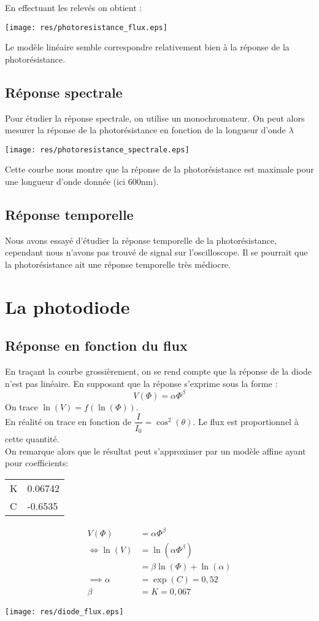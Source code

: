 \documentclass[12pt,a4paper]{article}
\begin{document}
	En effectuant les relevés on obtient : 
	\begin{center}
		\texttt{[image: res/photoresistance\_flux.eps]}
	\end{center}
	Le modèle linéaire semble correspondre relativement bien à la réponse de la photorésistance.
	
	\subsection{Réponse spectrale}
	Pour étudier la réponse spectrale, on utilise un monochromateur.
	On peut alors mesurer la réponse de la photorésistance en fonction de la longueur d'onde $\lambda$
	\begin{center}
		\texttt{[image: res/photoresistance\_spectrale.eps]}
	\end{center}
	Cette courbe nous montre que la réponse de la photorésistance est maximale pour une longueur d'onde donnée (ici 600nm).
	
	\subsection{Réponse temporelle}
	Nous avons essayé d'étudier la réponse temporelle de la photorésistance, cependant nous n'avons pas trouvé de signal sur l'oscilloscope. Il se pourrait que la photorésistance ait une réponse temporelle très médiocre.
	
	\section{La photodiode}
	\subsection{Réponse en fonction du flux}
	En traçant la courbe grossièrement, on se rend compte que la réponse de la diode n'est pas linéaire. En supposant que la réponse s'exprime sous la forme : $$V(\Phi)=\alpha\Phi^{\beta}$$
	On trace $\ln(V)=f(\ln(\Phi))$.\\
	En réalité on trace en fonction de $\dfrac{I}{I_0}=\cos^2(\theta)$. Le flux est proportionnel à cette quantité.\\
	On remarque alors que le résultat peut s'approximer par un modèle affine ayant pour coefficients:\\
	\begin{center}
		\begin{tabular}{ll}
			K & 0.06742\\
			C & -0.6535\\
		\end{tabular}
	\end{center}
	\begin{align*}
	V(\Phi) &=\alpha\Phi^{\beta}\\
	\iff \ln(V) &=\ln(\alpha\Phi^{\beta})\\
	&=\beta\ln(\Phi)+\ln(\alpha)\\[2em]
	\implies \alpha &=\exp(C)=0,52\\
	\beta &= K=0,067
	\end{align*}
	\begin{center}
		\texttt{[image: res/diode\_flux.eps]}
	\end{center}
\end{document}
